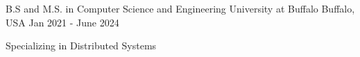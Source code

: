 

\begin{cventries}


  \cventry
    {B.S and M.S. in Computer Science and Engineering} %
    {University at Buffalo} %
    {Buffalo, USA} %
    {Jan 2021 - June 2024} %
    {
      \begin{cvitems} %
        \item {Specializing in Distributed Systems}
      \end{cvitems}
    }



\end{cventries}
